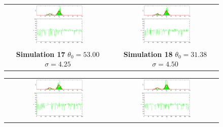 \begin{figure}\label{fig: SimulationMetropolis2}
\begin{tabular}{cc} 
\includegraphics[width=0.5\textwidth]{ImaginiLatex/MetropolisExample17.eps} &
\includegraphics[width=0.5\textwidth]{ImaginiLatex/MetropolisExample18.eps} \\
\textbf{Simulation 17} $\theta_0=   53.00$  $\sigma=    4.25$  & \textbf{Simulation 18} $\theta_0=   31.38$  $\sigma=    4.50$
\end{tabular}
\begin{tabular}{cc} 
\includegraphics[width=0.5\textwidth]{ImaginiLatex/MetropolisExample19.eps} &
\includegraphics[width=0.5\textwidth]{ImaginiLatex/MetropolisExample20.eps} \\

\end{tabular}
\end{figure}
